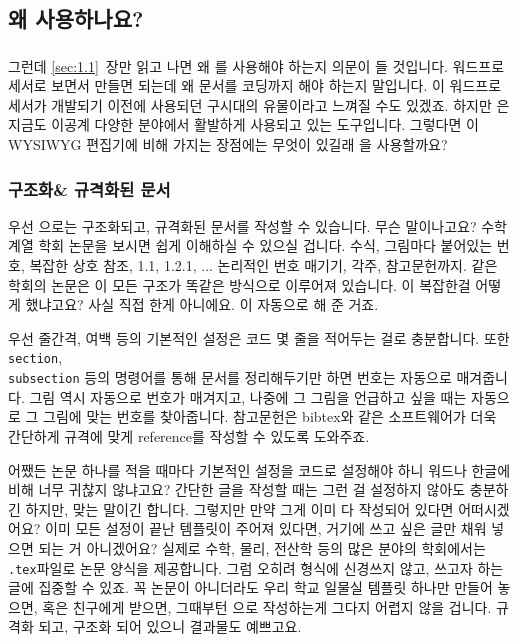 \subsection{왜  사용하나요?}
\label{sec:1.2}
\subsubsection*{}
그런데 \ref{sec:1.1}~장만 읽고 나면 왜 \lt 를 사용해야 하는지 의문이 들 것입니다.
워드프로세서로 보면서 만들면 되는데 왜 문서를 코딩까지 해야 하는지 말입니다.
\lt 이 워드프로세서가 개발되기 이전에 사용되던 구시대의 유물이라고 느껴질 수도 있겠죠.
하지만 \lt 은 지금도 이공계 다양한 분야에서 활발하게 사용되고 있는 도구입니다.
그렇다면 \lt 이  WYSIWYG 편집기에 비해 가지는 장점에는 무엇이 있길래 \lt 을 사용할까요?

\subsubsection{구조화\& 규격화된 문서}
\label{sec:1.2-org}

우선 \lt 으로는 구조화되고, 규격화된 문서를 작성할 수 있습니다.
무슨 말이나고요?
수학 계열 학회 논문을 보시면 쉽게 이해하실 수 있으실 겁니다.
수식, 그림마다 붙어있는 번호, 복잡한 상호 참조, 1.1, 1.2.1, ... 논리적인 번호 매기기, 각주, 참고문헌까지.
같은 학회의 논문은 이 모든 구조가 똑같은 방식으로 이루어져 있습니다.
이 복잡한걸 어떻게 했냐고요?
사실 직접 한게 아니에요.
\lt 이 자동으로 해 준 거죠.

우선 줄간격, 여백 등의 기본적인 설정은 코드 몇 줄을 적어두는 걸로 충분합니다.
또한 \verb|section|, \\ \verb|subsection| 등의 명령어를 통해 문서를 정리해두기만 하면 번호는  자동으로 매겨줍니다.
그림 역시 자동으로 번호가 매겨지고, 나중에 그 그림을 언급하고 싶을 때는 자동으로 그 그림에 맞는 번호를 찾아줍니다.
참고문헌은 bibtex와 같은 소프트웨어가 더욱 간단하게 규격에 맞게 reference를 작성할 수 있도록 도와주죠.

어쨌든 논문 하나를 적을 때마다 기본적인 설정을 코드로 설정해야 하니 워드나 한글에 비해 너무 귀찮지 않냐고요?
간단한 글을 작성할 때는 그런 걸 설정하지 않아도 충분하긴 하지만, 맞는 말이긴 합니다.
그렇지만 만약 그게 이미 다 작성되어 있다면 어떠시겠어요?
이미 모든 설정이 끝난 템플릿이 주어져 있다면, 거기에 쓰고 싶은 글만 채워 넣으면 되는 거 아니겠어요?
실제로 수학, 물리, 전산학 등의 많은 분야의 학회에서는  \verb|.tex|파일로 논문 양식을 제공합니다.
그럼 오히려 형식에 신경쓰지 않고, 쓰고자 하는 글에 집중할 수 있죠.
꼭 논문이 아니더라도 우리 학교 일물실 템플릿 하나만 만들어 놓으면, 혹은 친구에게 받으면, 그때부턴 \lt 으로 작성하는게 그다지 어렵지 않을 겁니다. 규격화 되고, 구조화 되어 있으니 결과물도 예쁘고요.

